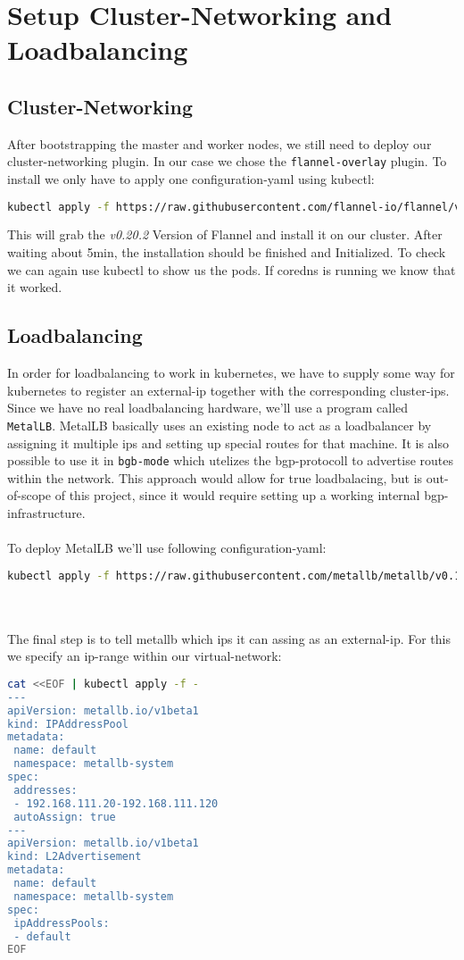 \section{Setup Cluster-Networking and Loadbalancing}
\subsection{Cluster-Networking}
After bootstrapping the master and worker nodes, we still need to deploy our cluster-networking plugin. In our case we chose the \texttt{flannel-overlay} plugin.
To install we only have to apply one configuration-yaml using kubectl:
\begin{lstlisting}[language=bash,caption=Deploy Flannel-Networking] 
kubectl apply -f https://raw.githubusercontent.com/flannel-io/flannel/v0.20.2/Documentation/kube-flannel.yml
\end{lstlisting}
This will grab the \textit{v0.20.2} Version of Flannel and install it on our cluster.
After waiting about 5min, the installation should be finished and Initialized. To check we can again use kubectl to show us the pods. If coredns is running we know that it worked.
\subsection{Loadbalancing}
In order for loadbalancing to work in kubernetes, we have to supply some way for kubernetes to register an external-ip together with the corresponding cluster-ips. Since we have no real loadbalancing hardware, we'll use a program called \texttt{MetalLB}.
MetalLB basically uses an existing node to act as a loadbalancer by assigning it multiple ips and setting up special routes for that machine. It is also possible to use it in \texttt{bgb-mode} which utelizes the bgp-protocoll to advertise routes within the network. This approach would allow for true loadbalacing, but is out-of-scope of this project, since it would require setting up a working internal bgp-infrastructure.
\\\\
To deploy MetalLB we'll use following configuration-yaml:
\begin{lstlisting}[language=bash,caption=Deploy MetalLB Loadbalacing] 
kubectl apply -f https://raw.githubusercontent.com/metallb/metallb/v0.13.7/config/manifests/metallb-native.yaml
\end{lstlisting}
\\\\
The final step is to tell metallb which ips it can assing as an external-ip. For this we specify an ip-range within our virtual-network:
\begin{lstlisting}[language=bash,caption=Set assinable IP-Ranges for external IPs] 
cat <<EOF | kubectl apply -f -
---
apiVersion: metallb.io/v1beta1
kind: IPAddressPool
metadata:
 name: default
 namespace: metallb-system
spec:
 addresses:
 - 192.168.111.20-192.168.111.120
 autoAssign: true
---
apiVersion: metallb.io/v1beta1
kind: L2Advertisement
metadata:
 name: default
 namespace: metallb-system
spec:
 ipAddressPools:
 - default
EOF
\end{lstlisting}


